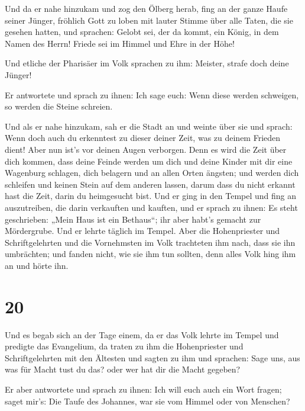  Und da er nahe hinzukam und zog den Ölberg herab, fing
an der ganze Haufe seiner Jünger, fröhlich Gott zu loben mit lauter
Stimme über alle Taten, die sie gesehen hatten,  und
sprachen: Gelobt sei, der da kommt, ein König, in dem Namen des Herrn!
Friede sei im Himmel und Ehre in der Höhe!

 Und etliche der Pharisäer im Volk sprachen zu ihm:
Meister, strafe doch deine Jünger!

 Er antwortete und sprach zu ihnen: Ich sage euch: Wenn
diese werden schweigen, so werden die Steine schreien.

 Und als er nahe hinzukam, sah er die Stadt an und weinte
über sie  und sprach: Wenn doch auch du erkenntest zu
dieser deiner Zeit, was zu deinem Frieden dient! Aber nun ist's vor
deinen Augen verborgen.  Denn es wird die Zeit über dich
kommen, dass deine Feinde werden um dich und deine Kinder mit dir eine
Wagenburg schlagen, dich belagern und an allen Orten ängsten;
 und werden dich schleifen und keinen Stein auf dem
anderen lassen, darum dass du nicht erkannt hast die Zeit, darin du
heimgesucht bist.  Und er ging in den Tempel und fing an
auszutreiben, die darin verkauften und kauften,  und er
sprach zu ihnen: Es steht geschrieben: „Mein Haus ist ein Bethaus``; ihr
aber habt's gemacht zur Mördergrube.  Und er lehrte
täglich im Tempel. Aber die Hohenpriester und Schriftgelehrten und die
Vornehmsten im Volk trachteten ihm nach, dass sie ihn umbrächten;
 und fanden nicht, wie sie ihm tun sollten, denn alles
Volk hing ihm an und hörte ihn.

\hypertarget{section-19}{%
\section{20}\label{section-19}}

 Und es begab sich an der Tage einem, da er das Volk
lehrte im Tempel und predigte das Evangelium, da traten zu ihm die
Hohenpriester und Schriftgelehrten mit den Ältesten  und
sagten zu ihm und sprachen: Sage uns, aus was für Macht tust du das?
oder wer hat dir die Macht gegeben?

 Er aber antwortete und sprach zu ihnen: Ich will euch
auch ein Wort fragen; saget mir's:  Die Taufe des
Johannes, war sie vom Himmel oder von Menschen?

